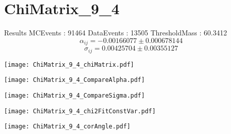 \documentclass[a4paper,12pt]{article}
\begin{document}
\section{ChiMatrix\_9\_4}
\begin{minipage}{0.49\linewidth} Results \newline
MCEvents : 91464\newline
DataEvents : 13505 \newline
ThresholdMass : 60.3412\\
$$\alpha_{ij} = -0.00166077\pm 0.000678144$$
$$\sigma_{ij} = 0.00425704\pm 0.00355127$$
\end{minipage}\hfill
\begin{minipage}{0.49\linewidth} 
\texttt{[image: ChiMatrix\_9\_4\_chiMatrix.pdf]}\\
\end{minipage}
\hfill
\begin{minipage}{0.49\linewidth} 
\texttt{[image: ChiMatrix\_9\_4\_CompareAlpha.pdf]}\\
\end{minipage}
\hfill
\begin{minipage}{0.49\linewidth} 
\texttt{[image: ChiMatrix\_9\_4\_CompareSigma.pdf]}\\
\end{minipage}
\begin{minipage}{0.49\linewidth} 
\texttt{[image: ChiMatrix\_9\_4\_chi2FitConstVar.pdf]}\\
\end{minipage}
\hfill
\begin{minipage}{0.49\linewidth} 
\texttt{[image: ChiMatrix\_9\_4\_corAngle.pdf]}\\
\end{minipage}
\end{document}
